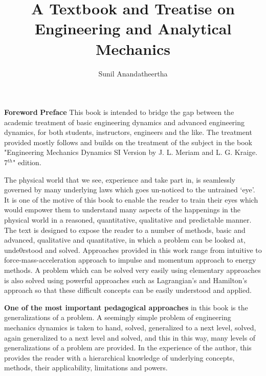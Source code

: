 \documentclass[]{book}
\author{Sunil Anandatheertha}\title{A Textbook and Treatise on Engineering and Analytical  Mechanics}
\begin{document}
\frontmatter

\tableofcontents

\mainmatter
{\flushleft\textbf{Foreword}}
\vspace{1cm}
\newpage
{\flushleft\textbf{Preface}}
\vspace{1cm}
This book is intended to bridge the gap between the academic treatment of basic engineering dynamics and advanced engineering dynamics, for both students, instructors, engineers and the like. The treatment provided mostly follows and builds on the treatment of the subject in the book "Engineering Mechanics Dynamics SI Version by J. L. Meriam and L. G. Kraige. 7$^{th}$" edition.

The physical world that we see, experience and take part in, is seamlessly governed by many underlying laws which goes un-noticed to the untrained `eye'. It is one of the motive of this book to enable the reader to train their eyes which would empower them to understand many aspects of the happenings in the physical world in a reasoned, quantitative, qualitative and predictable manner. The text is designed to expose the reader to a number of methods, basic and advanced, qualitative and quantitative, in which a problem can be looked at, unde0rstood and solved. Approaches provided in this work range from intuitive to force-mass-acceleration approach to impulse and momentum approach to energy methods. A problem which can be solved very easily using elementary approaches is also solved using powerful approaches such as Lagrangian's and Hamilton's approach so that these difficult concepts can be easily understood and applied.

\textbf{One of the most important pedagogical approaches} in this book is the generalizations of a problem. A seemingly simple problem of engineering mechanics dynamics is taken to hand, solved, generalized to a next level, solved, again generalized to a next level and solved, and this in this way, many levels of generalizations of a problem are provided. In the experience of the author, this provides the reader with a hierarchical knowledge of underlying concepts, methods, their applicability, limitations and powers.
\end{document}
